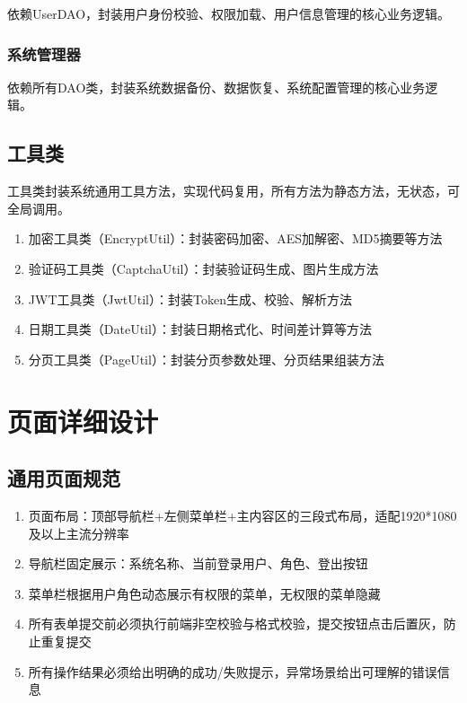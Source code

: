 \documentclass[12pt, a4paper]{article}
\begin{document}
依赖UserDAO，封装用户身份校验、权限加载、用户信息管理的核心业务逻辑。

\subsubsection{系统管理器}

依赖所有DAO类，封装系统数据备份、数据恢复、系统配置管理的核心业务逻辑。

\subsection{工具类}

工具类封装系统通用工具方法，实现代码复用，所有方法为静态方法，无状态，可全局调用。

\begin{enumerate}
\item  加密工具类（EncryptUtil）：封装密码加密、AES加解密、MD5摘要等方法

\item  验证码工具类（CaptchaUtil）：封装验证码生成、图片生成方法

\item  JWT工具类（JwtUtil）：封装Token生成、校验、解析方法

\item  日期工具类（DateUtil）：封装日期格式化、时间差计算等方法

\item  分页工具类（PageUtil）：封装分页参数处理、分页结果组装方法
\end{enumerate}

\section{页面详细设计}

\subsection{通用页面规范}

\begin{enumerate}
\item  页面布局：顶部导航栏+左侧菜单栏+主内容区的三段式布局，适配1920*1080及以上主流分辨率

\item  导航栏固定展示：系统名称、当前登录用户、角色、登出按钮

\item  菜单栏根据用户角色动态展示有权限的菜单，无权限的菜单隐藏

\item  所有表单提交前必须执行前端非空校验与格式校验，提交按钮点击后置灰，防止重复提交

\item  所有操作结果必须给出明确的成功/失败提示，异常场景给出可理解的错误信息
\end{enumerate}
\end{document}
